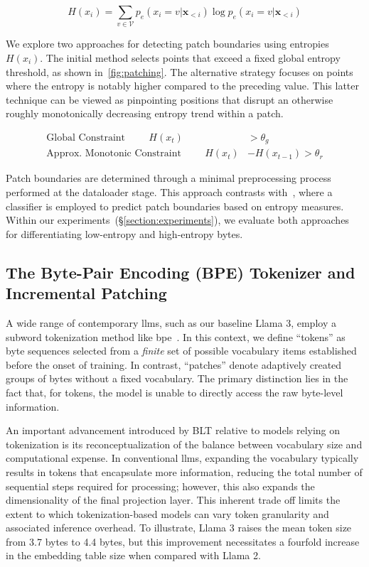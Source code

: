 \begin{equation}
H(x_i) = \sum_{v \in \mathcal{V}} p_{e}(x_i=v|\pmb{x}_{<i}) \log p_{e}(x_i=v|\pmb{x}_{<i})
\end{equation}

We explore two approaches for detecting patch boundaries using entropies $H(x_i)$. The initial method selects points that exceed a fixed global entropy threshold, as shown in~\autoref{fig:patching}. The alternative strategy focuses on points where the entropy is notably higher compared to the preceding value. This latter technique can be viewed as pinpointing positions that disrupt an otherwise roughly monotonically decreasing entropy trend within a patch.

\begin{align*}
    \text{Global Constraint}\hspace{1cm}H(x_t)& > \theta_g\\
    \text{Approx. Monotonic Constraint}\hspace{1cm}H(x_t)& - H(x_{t-1}) > \theta_r
\end{align*}

Patch boundaries are determined through a minimal preprocessing process performed at the dataloader stage. This approach contrasts with~\citet{nawrot-etal-2023-efficient}, where a classifier is employed to predict patch boundaries based on entropy measures. Within our experiments~(\S\ref{section:experiments}), we evaluate both approaches for differentiating low-entropy and high-entropy bytes.

\subsection{The Byte-Pair Encoding (BPE) Tokenizer and Incremental Patching}
\label{section:incremental-patching}
\label{section:bpe-patch}

A wide range of contemporary llms, such as our baseline Llama 3, employ a subword tokenization method like bpe~\citep{gage1994new, sennrich-etal-2016-neural}. In this context, we define ``tokens'' as byte sequences selected from a \textit{finite} set of possible vocabulary items established before the onset of training. In contrast, ``patches'' denote adaptively created groups of bytes without a fixed vocabulary. The primary distinction lies in the fact that, for tokens, the model is unable to directly access the raw byte-level information.

An important advancement introduced by {\textsc BLT} relative to models relying on tokenization is its reconceptualization of the balance between vocabulary size and computational expense. In conventional llms, expanding the vocabulary typically results in tokens that encapsulate more information, reducing the total number of sequential steps required for processing; however, this also expands the dimensionality of the final projection layer. This inherent trade off limits the extent to which tokenization-based models can vary token granularity and associated inference overhead. To illustrate, Llama 3 raises the mean token size from 3.7 bytes to 4.4 bytes, but this improvement necessitates a fourfold increase in the embedding table size when compared with Llama 2.

